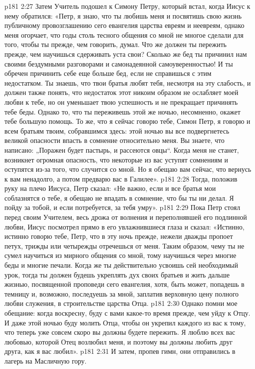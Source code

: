 \vs p181 2:27 \pc Затем Учитель подошел к Симону Петру, который встал, когда Иисус к нему обратился: «Петр, я знаю, что ты любишь меня и посвятишь свою жизнь публичному провозглашению сего евангелия царства евреям и неевреям, однако меня огорчает, что годы столь тесного общения со мной не многое сделали для того, чтобы ты прежде, чем говорить, думал. Что же должен ты пережить прежде, чем научишься сдерживать уста свои? Сколько же бед ты причинил нам своими бездумными разговорами и самонадеянной самоуверенностью! И ты обречен причинить себе еще больше бед, если не справишься с этим недостатком. Ты знаешь, что твои братья любят тебя, несмотря на эту слабость, и должен также понять, что недостаток этот никоим образом не ослабляет моей любви к тебе, но он уменьшает твою успешность и не прекращает причинять тебе беды. Однако то, что ты переживешь этой же ночью, несомненно, окажет тебе большую помощь. То же, что я сейчас говорю тебе, Симон Петр, я говорю и всем братьям твоим, собравшимся здесь: этой ночью вы все подвергнетесь великой опасности впасть в сомнение относительно меня. Вы знаете, что написано: „Поражен будет пастырь, и рассеются овцы“. Когда меня не станет, возникнет огромная опасность, что некоторые из вас уступят сомнениям и оступятся из\hyp{}за того, что случится со мной. Но я обещаю вам сейчас, что вернусь к вам ненадолго, а потом предварю вас в Галилее».
\vs p181 2:28 Тогда, положив руку на плечо Иисуса, Петр сказал: «Не важно, если и все братья мои соблазнятся о тебе, я обещаю не впадать в сомнение, что бы ты ни делал. Я пойду за тобой, и если потребуется, за тебя умру».
\vs p181 2:29 Пока Петр стоял перед своим Учителем, весь дрожа от волнения и переполнявшей его подлинной любви, Иисус посмотрел прямо в его увлажнившиеся глаза и сказал: «Истинно, истинно говорю тебе, Петр, что в эту ночь прежде, нежели дважды пропоет петух, трижды или четырежды отречешься от меня. Таким образом, чему ты не сумел научиться из мирного общения со мной, тому научишься через многие беды и многие печали. Когда же ты действительно усвоишь сей необходимый урок, тогда ты должен будешь укреплять дух своих братьев и жить дальше жизнью, посвященной проповеди сего евангелия, хотя, быть может, попадешь в темницу и, возможно, последуешь за мной, заплатив верховную цену полного любви служения, в строительстве царства Отца.
\vs p181 2:30 Однако помни мое обещание: когда воскресну, буду с вами какое\hyp{}то время прежде, чем уйду к Отцу. И даже этой ночью буду молить Отца, чтобы он укрепил каждого из вас к тому, что теперь уже совсем скоро вы должны будете пережить. Я люблю всех вас любовью, которой Отец возлюбил меня, и поэтому вы должны любить друг друга, как я вас любил».
\vs p181 2:31 \pc И затем, пропев гимн, они отправились в лагерь на Масличную гору.
